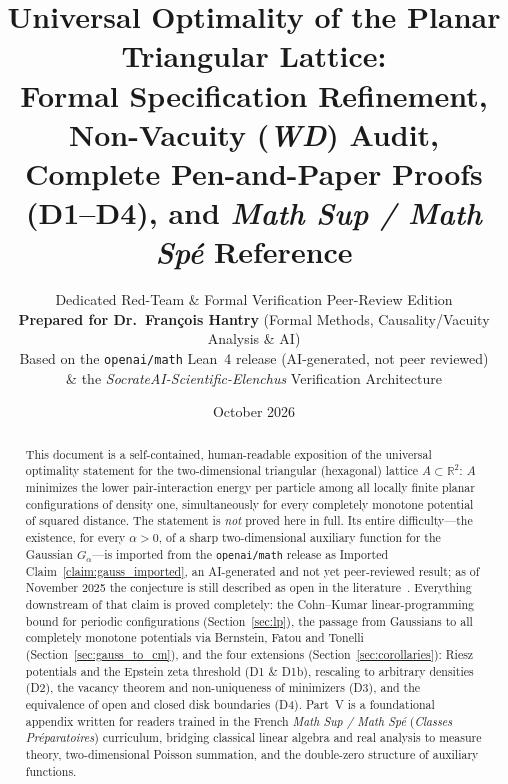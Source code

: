 \documentclass[11pt, a4paper]{article}
\title{\textbf{Universal Optimality of the Planar Triangular Lattice:}\\[0.3em]
\large Formal Specification Refinement, Non-Vacuity (\textit{WD}) Audit,\\
Complete Pen-and-Paper Proofs (D1--D4), and \textit{Math Sup / Math Sp\'e} Reference}
\author{Dedicated Red-Team \& Formal Verification Peer-Review Edition\\
\textbf{Prepared for Dr.\ Fran\c{c}ois Hantry} (Formal Methods, Causality/Vacuity Analysis \& AI)\\
\small Based on the \texttt{openai/math} Lean~4 release (AI-generated, not peer reviewed)\\
\small \& the \textit{SocrateAI-Scientific-Elenchus} Verification Architecture}
\date{October 2026}
\theoremstyle{definition}
\theoremstyle{remark}
\newcommand{\R}{\mathbb{R}}
\begin{document}
\maketitle

\begin{abstract}
\noindent This document is a self-contained, human-readable exposition of the universal optimality statement for the two-dimensional triangular (hexagonal) lattice $A \subset \R^2$: $A$ minimizes the lower pair-interaction energy per particle among all locally finite planar configurations of density one, simultaneously for every completely monotone potential of squared distance. The statement is \emph{not} proved here in full. Its entire difficulty---the existence, for every $\alpha > 0$, of a sharp two-dimensional auxiliary function for the Gaussian $G_\alpha$---is imported from the \texttt{openai/math} release as Imported Claim~\ref{claim:gauss_imported}, an AI-generated and not yet peer-reviewed result; as of November 2025 the conjecture is still described as open in the literature~\cite{Leble25}. Everything downstream of that claim is proved completely: the Cohn--Kumar linear-programming bound for periodic configurations (Section~\ref{sec:lp}), the passage from Gaussians to all completely monotone potentials via Bernstein, Fatou and Tonelli (Section~\ref{sec:gauss_to_cm}), and the four extensions (Section~\ref{sec:corollaries}): Riesz potentials and the Epstein zeta threshold (D1 \& D1b), rescaling to arbitrary densities (D2), the vacancy theorem and non-uniqueness of minimizers (D3), and the equivalence of open and closed disk boundaries (D4). Part~V is a foundational appendix written for readers trained in the French \textit{Math Sup / Math Sp\'e} (\textit{Classes Pr\'eparatoires}) curriculum, bridging classical linear algebra and real analysis to measure theory, two-dimensional Poisson summation, and the double-zero structure of auxiliary functions.
\end{abstract}
\end{document}
